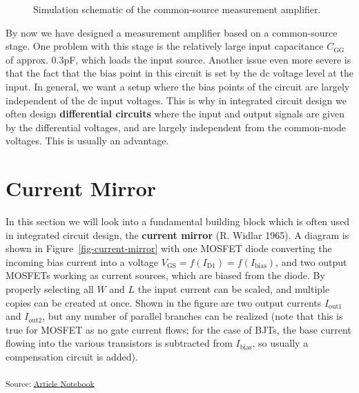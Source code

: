 \documentclass[
  a4paper,
  DIV=11,
  numbers=noendperiod]{scrartcl}
\begin{document}
\begin{tcolorbox}
\begin{figure}[H]
{}

\caption{\label{fig-meas-amp-tb}Simulation schematic of the
common-source measurement amplifier.}

\end{figure}%

\end{tcolorbox}

By now we have designed a measurement amplifier based on a common-source
stage. One problem with this stage is the relatively large input
capacitance \(C_\mathrm{GG}\) of approx. 0.3pF, which loads the input
source. Another issue even more severe is that the fact that the bias
point in this circuit is set by the dc voltage level at the input. In
general, we want a setup where the bias points of the circuit are
largely independent of the dc input voltages. This is why in integrated
circuit design we often design \textbf{differential circuits} where the
input and output signals are given by the differential voltages, and are
largely independent from the common-mode voltages. This is usually an
advantage.

\section{Current Mirror}\label{sec-current-mirror}

In this section we will look into a fundamental building block which is
often used in integrated circuit design, the \textbf{current mirror} (R.
Widlar 1965). A diagram is shown in Figure~\ref{fig-current-mirror} with
one MOSFET diode converting the incoming bias current into a voltage
\(V_\mathrm{GS}= f(I_\mathrm{D1}) = f(I_\mathrm{bias})\), and two output
MOSFETs working as current sources, which are biased from the diode. By
properly selecting all \(W\) and \(L\) the input current can be scaled,
and multiple copies can be created at once. Shown in the figure are two
output currents \(I_\mathrm{out1}\) and \(I_\mathrm{out2}\), but any
number of parallel branches can be realized (note that this is true for
MOSFET as no gate current flows; for the case of BJTs, the base current
flowing into the various transistors is subtracted from
\(I_\mathrm{bias}\), so usually a compensation circuit is added).

\textsubscript{Source:
\href{https://iic-jku.github.io/analog-circuit-design/index.qmd.html}{Article
Notebook}}
\end{document}
